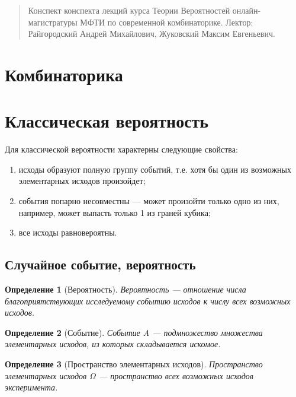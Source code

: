 \documentclass{article}
\theoremstyle{mydef}
\newtheorem{definition}{Определение}
\begin{document}
\begin{abstract}
    Конспект конспекта лекций курса Теории Вероятностей онлайн-магистратуры МФТИ по современной комбинаторике. \newline
    Лектор: Райгородский Андрей Михайлович, Жуковский Максим Евгеньевич.
\end{abstract}

\tableofcontents
 
\newpage

\section{Комбинаторика}

\section{Классическая вероятность}

Для классической вероятности характерны следующие свойства:
\begin{enumerate}
    \item исходы образуют полную группу событий, т.е. хотя бы один из возможных элементарных исходов произойдет;
    \item события попарно несовместны --- может произойти только одно из них, например, может выпасть только 1 из граней кубика;
    \item все исходы равновероятны.
\end{enumerate}

\subsection{Случайное событие, вероятность}

\begin{definition}[Вероятность]
    Вероятность --- отношение числа благоприятствующих исследуемому событию исходов к числу всех возможных исходов.
\end{definition}

\begin{definition}[Событие]
    Событие A --- подмножество множества элементарных исходов, из которых складывается искомое.
\end{definition}

\begin{definition}[Пространство элементарных исходов]
    Пространство элементарных исходов $\Omega$ --- пространство всех возможных исходов эксперимента.
\end{definition}
\end{document}
